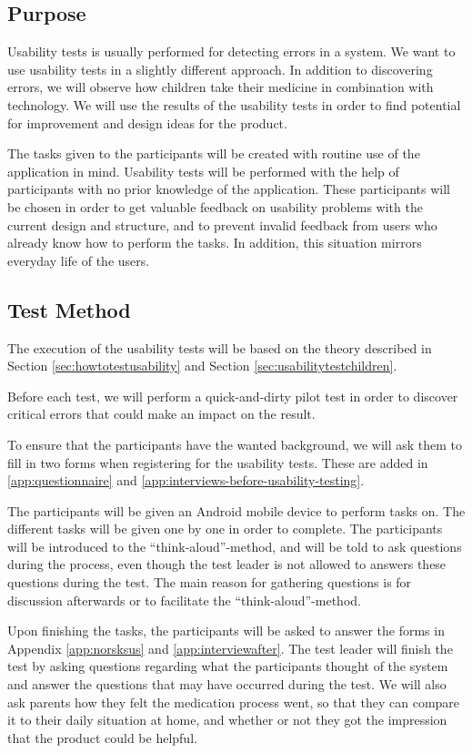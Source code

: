 
\subsection{Purpose}
\label{sec:usabilitypurpose}
Usability tests is usually performed for detecting errors in a system. We want to use usability tests in a slightly different approach. In addition to discovering errors, we will  observe how children take their medicine in combination with technology. We will use the results of the usability tests in order to find potential for improvement and design ideas for  the product.
 
The tasks given to the participants will be created with routine use of the application in mind. Usability tests will be performed with the help of participants with no prior knowledge of the application. These participants will be chosen in order to get valuable feedback on usability problems with the current design and structure, and to prevent invalid feedback from users who already know how to perform the tasks. In addition, this situation mirrors everyday life of the users.


\subsection{Test Method}
The execution of the usability tests will be based on the theory described in Section \ref{sec:howtotestusability} and Section \ref{sec:usabilitytestchildren}.

Before each test, we will perform a quick-and-dirty pilot test in order to discover critical errors that could make an impact on the result.

To ensure that the participants have the wanted background, we will ask them to fill in two forms when registering for the usability tests. These are added in \ref{app:questionnaire} and \ref{app:interviews-before-usability-testing}.

The participants will be given an Android mobile device to perform tasks on. The different tasks will be given one by one in order to complete. The participants will be introduced to the ``think-aloud''-method, and will be told to ask questions during the process, even though the test leader is not allowed to answers these questions during the test. The main reason for gathering questions is for discussion afterwards or to facilitate the ``think-aloud''-method. 

Upon finishing the tasks, the participants will be asked to answer the forms in Appendix \ref{app:norsksus} and \ref{app:interviewafter}. The test leader will finish the test by asking questions regarding what the participants thought of the system and answer the questions that may have occurred during the test. We will also ask parents how they felt the medication process went, so that they can compare it to their daily situation at home, and whether or not they got the impression that the product could be helpful.  


